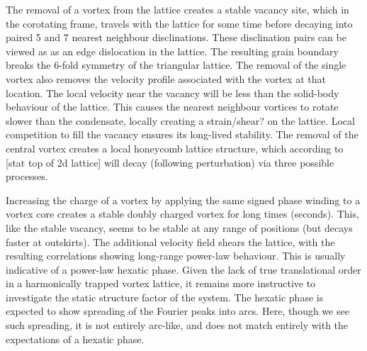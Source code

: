 The removal of a vortex from the lattice creates a stable vacancy site, which in the corotating frame, travels with the lattice for some time
before decaying into paired 5 and 7 nearest neighbour disclinations. These disclination pairs can be viewed as as an edge dislocation in the
lattice. The resulting grain boundary breaks the 6-fold symmetry of the triangular lattice. The removal of the single vortex also removes the
velocity profile associated with the vortex at that location. The local velocity near the vacancy will be less than the solid-body behaviour
of the lattice. This causes the nearest neighbour vortices to rotate slower than the condensate, locally creating a strain/shear? on the
lattice. Local competition to fill the vacancy ensures its long-lived stability. The removal of the central vortex creates a local honeycomb
lattice structure, which according to [stat top of 2d lattice] will decay (following perturbation) via three possible processes.

Increasing the charge of a vortex by applying the same signed phase winding to a vortex core creates a stable doubly charged vortex for long
times (seconds). This, like the stable vacancy, seems to be stable at any range of positions (but decays faster at outskirts). The additional
velocity field shears the lattice, with the resulting correlations showing long-range power-law behaviour. This is usually indicative of a
power-law hexatic phase. Given the lack of true translational order in a harmonically trapped vortex lattice, it remains more instructive to
investigate the static structure factor of the system. The hexatic phase is expected to show spreading of the Fourier peaks into arcs. Here,
though we see such spreading, it is not entirely arc-like, and does not match entirely with the expectations of a hexatic phase.




